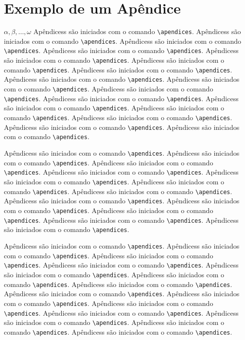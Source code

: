 \chapter{Exemplo de um Apêndice}
\label{apend:1}
$ \alpha, \beta, \ldots, \omega $ \newline
Apêndicess são iniciados com o comando \verb|\apendices|.
Apêndicess são iniciados com o comando \verb|\apendices|.
Apêndicess são iniciados com o comando \verb|\apendices|.
Apêndicess são iniciados com o comando \verb|\apendices|.
Apêndicess são iniciados com o comando \verb|\apendices|.
Apêndicess são iniciados com o comando \verb|\apendices|.
Apêndicess são iniciados com o comando \verb|\apendices|.
Apêndicess são iniciados com o comando \verb|\apendices|.
Apêndicess são iniciados com o comando \verb|\apendices|.
Apêndicess são iniciados com o comando \verb|\apendices|.
Apêndicess são iniciados com o comando \verb|\apendices|.
Apêndicess são iniciados com o comando \verb|\apendices|.
Apêndicess são iniciados com o comando \verb|\apendices|.
Apêndicess são iniciados com o comando \verb|\apendices|.
Apêndicess são iniciados com o comando \verb|\apendices|.
Apêndicess são iniciados com o comando \verb|\apendices|.

Apêndicess são iniciados com o comando \verb|\apendices|.
Apêndicess são iniciados com o comando \verb|\apendices|.
Apêndicess são iniciados com o comando \verb|\apendices|.
Apêndicess são iniciados com o comando \verb|\apendices|.
Apêndicess são iniciados com o comando \verb|\apendices|.
Apêndicess são iniciados com o comando \verb|\apendices|.
Apêndicess são iniciados com o comando \verb|\apendices|.
Apêndicess são iniciados com o comando \verb|\apendices|.
Apêndicess são iniciados com o comando \verb|\apendices|.
Apêndicess são iniciados com o comando \verb|\apendices|.
Apêndicess são iniciados com o comando \verb|\apendices|.
Apêndicess são iniciados com o comando \verb|\apendices|.

Apêndicess são iniciados com o comando \verb|\apendices|.
Apêndicess são iniciados com o comando \verb|\apendices|.
Apêndicess são iniciados com o comando \verb|\apendices|.
Apêndicess são iniciados com o comando \verb|\apendices|.
Apêndicess são iniciados com o comando \verb|\apendices|.
Apêndicess são iniciados com o comando \verb|\apendices|.
Apêndicess são iniciados com o comando \verb|\apendices|.
Apêndicess são iniciados com o comando \verb|\apendices|.
Apêndicess são iniciados com o comando \verb|\apendices|.
Apêndicess são iniciados com o comando \verb|\apendices|.
Apêndicess são iniciados com o comando \verb|\apendices|.
Apêndicess são iniciados com o comando \verb|\apendices|.
Apêndicess são iniciados com o comando \verb|\apendices|.
Apêndicess são iniciados com o comando \verb|\apendices|.

